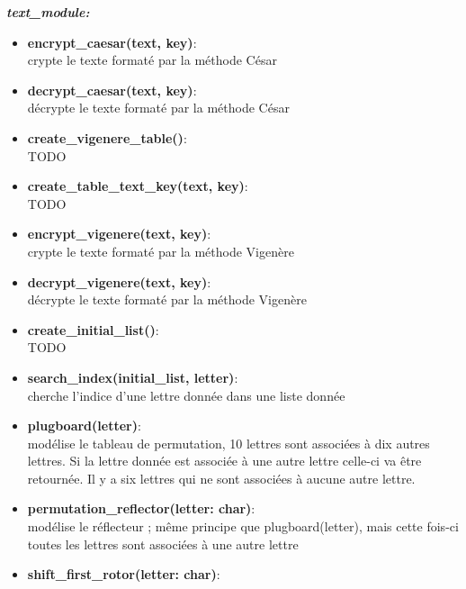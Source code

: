 \documentclass[a4paper,12pt,abstracton,titlepage]{scrartcl}
\begin{document}
{\newpage
\textit{\textbf{text\_module:}}\vspace{0.2cm}
\begin{itemize}
\item \textbf{encrypt\_caesar(text, key)}:\\
crypte le texte formaté par la méthode César\\
\item \textbf{decrypt\_caesar(text, key)}:\\
décrypte le texte formaté par la méthode César\\
\item \textbf{create\_vigenere\_table()}:\\
TODO\\
\item \textbf{create\_table\_text\_key(text, key)}:\\
TODO\\
\item \textbf{encrypt\_vigenere(text, key)}:\\
crypte le texte formaté par la méthode Vigenère\\
\item \textbf{decrypt\_vigenere(text, key)}:\\
décrypte le texte formaté par la méthode Vigenère\\
\item \textbf{create\_initial\_list()}:\\
TODO\\
\item \textbf{search\_index(initial\_list, letter)}:\\
cherche l'indice d'une lettre donnée dans une liste donnée\\
\item \textbf{plugboard(letter)}:\\
modélise le tableau de permutation, 10 lettres sont associées à dix autres lettres. Si la lettre donnée est associée à une autre lettre celle-ci va être retournée. Il y a six lettres qui ne sont associées à aucune autre lettre.\\
\item \textbf{permutation\_reflector(letter: char)}:\\
modélise le réflecteur ; même principe que plugboard(letter), mais cette fois-ci toutes les lettres sont associées à une autre lettre\\
\item \textbf{shift\_first\_rotor(letter: char)}:\\

\end{itemize}}
\end{document}
